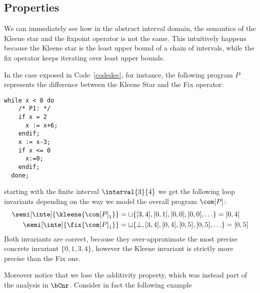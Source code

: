 \subsection{Properties}\label{sub:intervalsprop}

We can immediately see how in the abstract interval domain, the
semantics of the Kleene star and the fixpoint operator is not the
same. This intuitively happens because the Kleene star is the least
upper bound of a chain of intervals, while the fix operator keeps
iterating over least upper bounds.

\begin{example}\label{ex:fix} In the case exposed in
  Code~\ref{codedec}, for instance, the following program \(P\)
  represents the difference between the Kleene Star and the Fix
  operator:
  \begin{lstlisting}[caption=Program P\, denoting \(\fix{\com}\) and \(\com^*\) difference, label=codedec, language=Imp]
  while x < 8 do
    /* P1: */
    if x = 2
      x := x+6;
    endif;
    x := x-3;
    if x <= 0
      x:=0;
    endif;
  done;
  \end{lstlisting}
  starting with the finite interval \(\interval{3}{4}\) we get the
  following loop invariants depending on the way we model the overall
  program \(\com[P]\):
  \begin{align*}
    \semi[\inte]{\kleene{{\com[P]}_1}} & = \sqcup\{[3,4], [0,1], [0,0], [0,0], \ldots\} = [0,4]\\
    \semi[\inte]{\fix{{\com[P]}_1}} & = \sqcup\{\bot, [3,4], [0,4], [0,5], [0,5],\ldots\} = [0,5]
  \end{align*}
  \noindent
  Both invariants are correct, because they over-approximate the most
  precise concrete invariant \(\{0,1,3,4\}\), however the Kleene
  invariant is strictly more precise than the Fix one.
\end{example}

Moreover notice that we lose the additivity property, which was
instead part of the analysis in \(\bCnr\). Consider in fact the
following example

